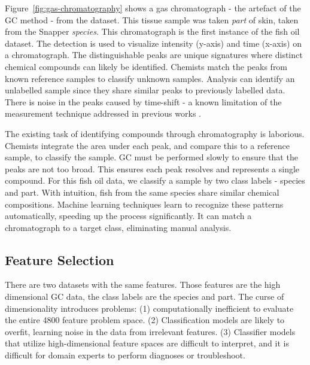 \documentclass[runningheads]{llncs}
\begin{document}
Figure~\ref{fig:gas-chromatography} shows a gas chromatograph - the artefact of the GC method - from the dataset. 
This tissue sample was taken \emph{part} of skin, taken from the Snapper \emph{species}.
This chromatograph is the first instance of the fish oil dataset.
The detection is used to visualize intensity (y-axis) and time (x-axis) on a chromatograph. 
The distinguishable peaks are unique signatures where distinct chemical compounds can likely be identified.
Chemists match the peaks from known reference samples to classify unknown samples. 
Analysis can identify an unlabelled sample since they share similar peaks to previously labelled data.
There is noise in the peaks caused by time-shift - a known limitation of the measurement technique addressed in previous works \cite{tomasi2004correlation,zhang2008two}.

The existing task \cite{eder1995gas,restek2018high} of identifying compounds through chromatography is laborious.
Chemists integrate the area under each peak, and compare this to a reference sample, to classify the sample.
GC must be performed slowly to ensure that the peaks are not too broad.
This ensures each peak resolves and represents a single compound.
For this fish oil data, we classify a sample by two class labels - species and part. 
With intuition, fish from the same species share similar chemical compositions.
Machine learning techniques learn to recognize these patterns automatically, speeding up the process significantly. 
It can match a chromatograph to a target class, eliminating manual analysis. 

\subsection{Feature Selection}
\label{sec:background-feature-selection}


There are two datasets with the same features. 
Those features are the high dimensional GC data, the class labels are the species and part.
The curse of dimensionality \cite{koppen2000curse} introduces problems: (1) computationally inefficient to evaluate the entire 4800 feature problem space. (2) Classification models are likely to overfit, learning noise in the data from irrelevant features. (3) Classifier models that utilize high-dimensional feature spaces are difficult to interpret, and it is difficult for domain experts to perform diagnoses or troubleshoot.
\end{document}
